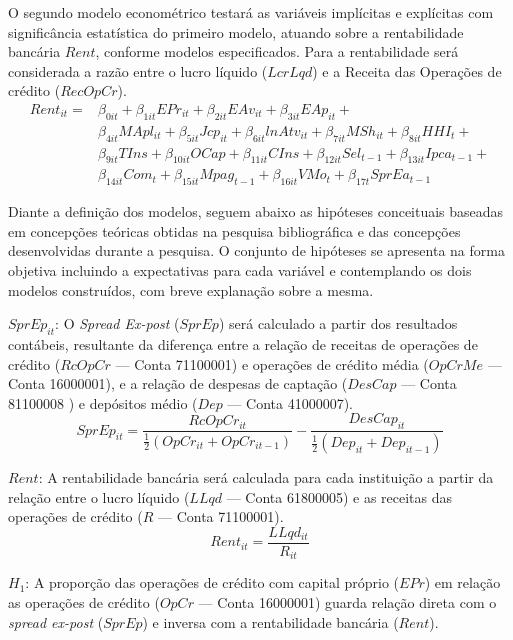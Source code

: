 \documentclass[12pt,12pt,openright,oneside,a4paper,chapter=TITLE,section=TITLE,subsection=TITLE,subsubsection=TITLE english,french,spanish,portugues,sumario=tradicional]{abntex2}
\begin{document}
O segundo modelo econométrico testará as variáveis implícitas e explícitas com significância estatística do primeiro modelo, atuando sobre a rentabilidade bancária \(Rent\), conforme modelos especificados. Para a rentabilidade será considerada a razão entre o lucro líquido (\(LcrLqd\)) e a Receita das Operações de crédito (\(RecOpCr\)).
\[\begin{aligned}
Rent_{it} = & \beta_{0it} + \beta_{1it}EPr_{it} + \beta_{2it}EAv_{it} + \beta_{3it}EAp_{it} + \\
&\beta_{4it}MApl_{it} + \beta_{5it}Jcp_{it}  + \beta_{6it}lnAtv_{it} + \beta_{7it}MSh_{it}  + \beta_{8it}HHI_{t} + \\
& \beta_{9it}TIns + \beta_{10it}OCap + \beta_{11it}CIns + \beta_{12it}Sel_{t-1} + \beta_{13it}Ipca_{t-1} + \\
& \beta_{14it}Com_{t} + \beta_{15it}Mpag_{t-1} + \beta_{16it}VMo_{t} +  \beta_{17t}SprEa_{t-1}
\end{aligned}\]

Diante a definição dos modelos, seguem abaixo as hipóteses conceituais baseadas em concepções teóricas obtidas na pesquisa bibliográfica e das concepções desenvolvidas durante a pesquisa. O conjunto de hipóteses se apresenta na forma objetiva incluindo a expectativas para cada variável e contemplando os dois modelos construídos, com breve explanação sobre a mesma.

\(SprEp_{it}\): O \emph{Spread Ex-post} (\(SprEp\)) será calculado a partir dos resultados contábeis, resultante da diferença entre a relação de receitas de operações de crédito (\(RcOpCr\) --- Conta 71100001) e operações de crédito média (\(OpCrMe\) --- Conta 16000001), e a relação de despesas de captação (\(DesCap\) --- Conta 81100008 ) e depósitos médio (\(Dep\) --- Conta 41000007).
\[
SprEp_{it} = \frac{RcOpCr_{it}}{\frac{1}{2}(OpCr_{it} + OpCr_{it-1}) } - \frac{DesCap_{it}}{\frac{1}{2}(Dep_{it} + Dep_{it-1})}
\]

\(Rent\): A rentabilidade bancária será calculada para cada instituição a partir da relação entre o lucro líquido (\(LLqd\) --- Conta 61800005) e as receitas das operações de crédito (\(R\) --- Conta 71100001).
\[
Rent_{it} = \frac{LLqd_{it}}{R_{it}}
\]

\(H_1\): A proporção das operações de crédito com capital próprio (\(EPr\)) em relação as operações de crédito (\(OpCr\) --- Conta 16000001) guarda relação direta com o \emph{spread ex-post} (\(SprEp\)) e inversa com a rentabilidade bancária (\(Rent\)).
\end{document}
